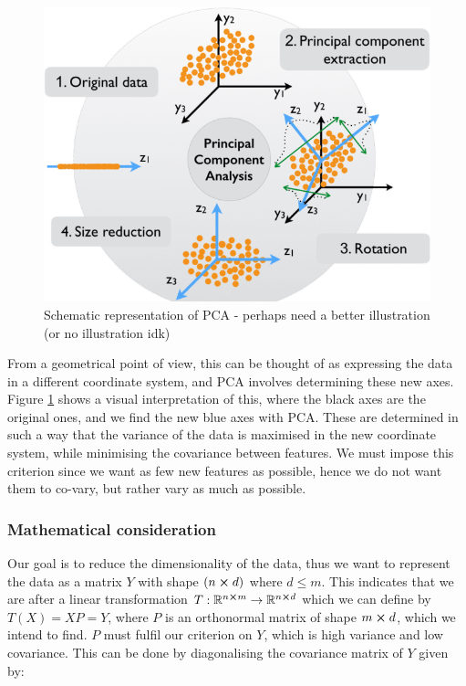         \begin{figure}
            \includegraphics[width=\linewidth]{figs/pca_schematic.png}
            \caption{Schematic representation of PCA - perhaps need a better illustration (or no illustration idk)\citep{pca_img}}
            \label{theo:fig:pca_schematic}
        \end{figure}
        
        From a geometrical point of view, this can be thought of as expressing the data in a different coordinate system, and PCA involves determining these new axes. Figure \ref{theo:fig:pca_schematic}  shows a visual interpretation of this, where the black axes are the original ones, and we find the new blue axes with PCA. These are determined in such a way that the variance of the data is maximised in the new coordinate system, while minimising the covariance between features. We must impose this criterion since we want as few new features as possible, hence we do not want them to co-vary, but rather vary as much as possible. 

    \subsubsection{Mathematical consideration}

    Our goal is to reduce the dimensionality of the data, thus we want to represent the data as a matrix $Y$ with shape $(n\cross d)$ where $d\leq m$. This indicates that we are after a linear transformation $T:\mathbb{R}^{n\cross m} \to \mathbb{R}^{n\cross d}$ which we can define by $T(X) = XP = Y$, where $P$ is an orthonormal matrix of shape $m\cross d$, which we intend to find. $P$ must fulfil our criterion on $Y$, which is high variance and low covariance. This can be done by diagonalising the covariance matrix of $Y$ given by:

